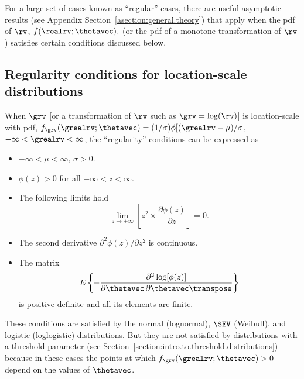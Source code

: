 For a large set of cases known as ``regular'' cases, there are
useful asymptotic results (see Appendix
Section~\ref{asection:general.theory}) that apply when the pdf of
$\rv$, $f(\realrv; \thetavec),$ (or the pdf of a monotone
transformation of $\rv$) satisfies certain conditions discussed
below.

\subsection{Regularity conditions for location-scale distributions}
When $\grv$ [or a transformation of $\rv$ such as $\grv=\log(\rv)$]
is location-scale with pdf, $f_{\grv}(\grealrv; \thetavec)=
(1/\sigma) \phi[(\grealrv-\mu)/\sigma$, $-\infty<\grealrv<\infty$,
the ``regularity'' conditions can be expressed as
\begin{itemize}
\item 
$-\infty< \mu < \infty$, $\sigma > 0$.
\item 
$ \phi(z) > 0 $ for all $-\infty < z < \infty$.
\item 
The following limits hold
\begin{displaymath}
	 \lim_{z \rightarrow \pm \infty} 
\left [
z^{2} \times
	 \frac{\partial  \phi (z)}
	      {\partial z}
\right ] = 0 .
\end{displaymath}
\item  
The second derivative $\partial ^{2} \phi(z)/\partial z^{2}$ is 
	 continuous.
\item  
The matrix
	 \begin{displaymath}
E \left \{-\frac{\partial ^ 2 \log [\phi(z)]}{\partial \thetavec
 \,
 \partial  \thetavec \transpose}
 \right \}
	 \end{displaymath}
 is positive definite and all its elements are  finite.
\end{itemize}
These conditions are satisfied by the normal (lognormal), $\SEV$
(Weibull), and logistic (loglogistic) distributions. But they are
not satisfied by distributions with a threshold parameter (see
Section~\ref{section:intro.to.threshold.distributions}) because in
these cases the points at which $f_{\grv}(\grealrv; \thetavec)>0$
depend on the values of $\thetavec$.


